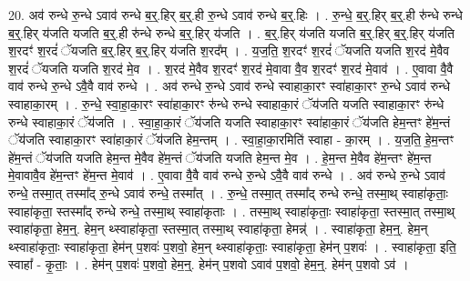 \documentclass[17pt]{extarticle}
\begin{document}
20. अव॑ रुन्धे रु॒न्धे ऽवाव॑ रुन्धे ब॒र्॒.हिर् ब॒र्॒.ही रु॒न्धे ऽवाव॑ रुन्धे ब॒र्॒.हिः । . रु॒न्धे॒ ब॒र्॒.हिर् ब॒र्॒.ही रु॑न्धे रुन्धे ब॒र्॒.हिर् य॑जति यजति ब॒र्॒.ही रु॑न्धे रुन्धे ब॒र्॒.हिर् य॑जति । . ब॒र्॒.हिर् य॑जति यजति ब॒र्॒.हिर् ब॒र्॒.हिर् य॑जति श॒रदꣳ॑ श॒रदं॑ ॅयजति ब॒र्॒.हिर् ब॒र्॒.हिर् य॑जति श॒रद᳚म् । . य॒ज॒ति॒ श॒रदꣳ॑ श॒रदं॑ ॅयजति यजति श॒रद॑ मे॒वैव श॒रदं॑ ॅयजति यजति श॒रद॑ मे॒व । . श॒रद॑ मे॒वैव श॒रदꣳ॑ श॒रद॑ मे॒वावा वै॒व श॒रदꣳ॑ श॒रद॑ मे॒वाव॑ । . ए॒वावा वै॒वै वाव॑ रुन्धे रु॒न्धे ऽवै॒वै वाव॑ रुन्धे । . अव॑ रुन्धे रु॒न्धे ऽवाव॑ रुन्धे स्वाहाका॒रꣳ स्वा॑हाका॒रꣳ रु॒न्धे ऽवाव॑ रुन्धे स्वाहाका॒रम् । . रु॒न्धे॒ स्वा॒हा॒का॒रꣳ स्वा॑हाका॒रꣳ रु॑न्धे रुन्धे स्वाहाका॒रं ॅय॑जति यजति स्वाहाका॒रꣳ रु॑न्धे रुन्धे स्वाहाका॒रं ॅय॑जति । . स्वा॒हा॒का॒रं ॅय॑जति यजति स्वाहाका॒रꣳ स्वा॑हाका॒रं ॅय॑जति हेम॒न्तꣳ हे॑म॒न्तं ॅय॑जति स्वाहाका॒रꣳ स्वा॑हाका॒रं ॅय॑जति हेम॒न्तम् । . स्वा॒हा॒का॒रमिति॑ स्वाहा - का॒रम् । . य॒ज॒ति॒ हे॒म॒न्तꣳ हे॑म॒न्तं ॅय॑जति यजति हेम॒न्त मे॒वैव हे॑म॒न्तं ॅय॑जति यजति हेम॒न्त मे॒व । . हे॒म॒न्त मे॒वैव हे॑म॒न्तꣳ हे॑म॒न्त मे॒वावावै॒व हे॑म॒न्तꣳ हे॑म॒न्त मे॒वाव॑ । . ए॒वावा वै॒वै वाव॑ रुन्धे रु॒न्धे ऽवै॒वै वाव॑ रुन्धे । . अव॑ रुन्धे रु॒न्धे ऽवाव॑ रुन्धे॒ तस्मा॒त् तस्मा᳚द् रु॒न्धे ऽवाव॑ रुन्धे॒ तस्मा᳚त् । . रु॒न्धे॒ तस्मा॒त् तस्मा᳚द् रुन्धे रुन्धे॒ तस्मा॒थ् स्वाहा॑कृताः॒ स्वाहा॑कृता॒ स्तस्मा᳚द् रुन्धे रुन्धे॒ तस्मा॒थ् स्वाहा॑कृताः । . तस्मा॒थ् स्वाहा॑कृताः॒ स्वाहा॑कृता॒ स्तस्मा॒त् तस्मा॒थ् स्वाहा॑कृता॒ हेम॒न्॒. हेम॒न् थ्स्वाहा॑कृता॒ स्तस्मा॒त् तस्मा॒थ् स्वाहा॑कृता॒ हेमन्न्॑ । . स्वाहा॑कृता॒ हेम॒न्॒. हेम॒न् थ्स्वाहा॑कृताः॒ स्वाहा॑कृता॒ हेम॑न् प॒शवः॑ प॒शवो॒ हेम॒न् थ्स्वाहा॑कृताः॒ स्वाहा॑कृता॒ हेम॑न् प॒शवः॑ । . स्वाहा॑कृता॒ इति॒ स्वाहा᳚ - कृ॒ताः॒ । . हेम॑न् प॒शवः॑ प॒शवो॒ हेम॒न्॒. हेम॑न् प॒शवो ऽवाव॑ प॒शवो॒ हेम॒न्॒. हेम॑न् प॒शवो ऽव॑ । \newline
\end{document}
